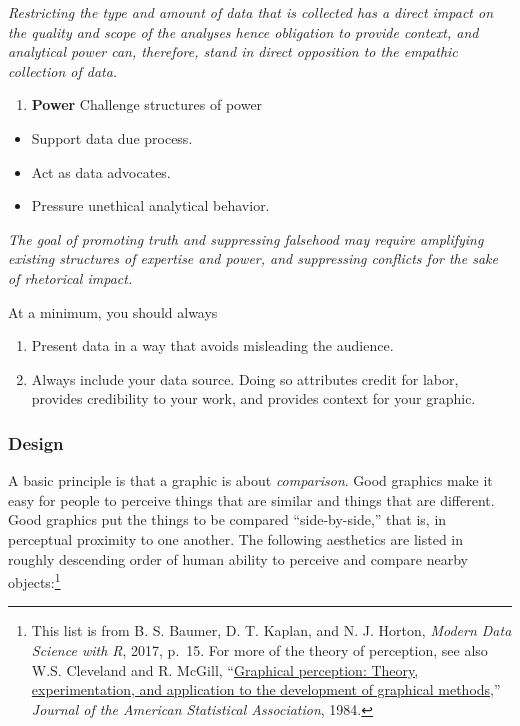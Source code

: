 \documentclass[
  letterpaper,
  DIV=11,
  numbers=noendperiod]{scrreprt}
\providecommand{\tightlist}{%
  \setlength{\itemsep}{0pt}\setlength{\parskip}{0pt}}\usepackage{longtable,booktabs,array}
\begin{document}
\emph{Restricting the type and amount of data that is collected has a
direct impact on the quality and scope of the analyses hence obligation
to provide context, and analytical power can, therefore, stand in direct
opposition to the empathic collection of data.}

\begin{enumerate}
\def\labelenumi{\arabic{enumi}.}
\setcounter{enumi}{2}
\tightlist
\item
  \textbf{Power} Challenge structures of power
\end{enumerate}

\begin{itemize}
\tightlist
\item
  Support data due process.
\item
  Act as data advocates.
\item
  Pressure unethical analytical behavior.
\end{itemize}

\emph{The goal of promoting truth and suppressing falsehood may require
amplifying existing structures of expertise and power, and suppressing
conflicts for the sake of rhetorical impact.}

At a minimum, you should always

\begin{enumerate}
\def\labelenumi{\arabic{enumi}.}
\item
  Present data in a way that avoids misleading the audience.
\item
  Always include your data source. Doing so attributes credit for labor,
  provides credibility to your work, and provides context for your
  graphic.
\end{enumerate}

\subsubsection*{Design}\label{design}

A basic principle is that a graphic is about \emph{comparison}. Good
graphics make it easy for people to perceive things that are similar and
things that are different. Good graphics put the things to be compared
``side-by-side,'' that is, in perceptual proximity to one another. The
following aesthetics are listed in roughly descending order of human
ability to perceive and compare nearby objects:\footnote{This list is
  from B. S. Baumer, D. T. Kaplan, and N. J. Horton, \emph{Modern Data
  Science with R}, 2017, p.~15. For more of the theory of perception,
  see also W.S. Cleveland and R. McGill,
  ``\href{http://www.math.pku.edu.cn/teachers/xirb/Courses/biostatistics/Biostatistics2016/GraphicalPerception_Jasa1984.pdf}{Graphical
  perception: Theory, experimentation, and application to the
  development of graphical methods},'' \emph{Journal of the American
  Statistical Association}, 1984.}
\end{document}
